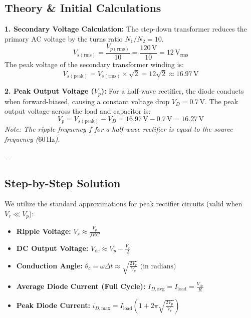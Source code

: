 \documentclass[12pt,a3paper]{article}
\begin{document}
\begin{enumerate}
\begin{tcolorbox}[enhanced,breakable,ansbox,colback=cA!4,colframe=cA,boxrule=0.8pt,arc=5pt,title={\textbf{Answer}},fonttitle=\bfseries\color{white},colbacktitle=cA]
\subsection*{Theory \& Initial Calculations}

\textbf{1. Secondary Voltage Calculation:}
The step-down transformer reduces the primary AC voltage by the turns ratio $N_1/N_2 = 10$.
\begin{equation}
    V_{s(\text{rms})} = \frac{V_{p(\text{rms})}}{10} = \frac{120\,\text{V}}{10} = 12\,\text{V}_{\text{rms}}
\end{equation}
The peak voltage of the secondary transformer winding is:
\begin{equation}
    V_{s(\text{peak})} = V_{s(\text{rms})} \times \sqrt{2} = 12\sqrt{2} \approx 16.97\,\text{V}
\end{equation}

\textbf{2. Peak Output Voltage ($V_p$):}
For a half-wave rectifier, the diode conducts when forward-biased, causing a constant voltage drop $V_D = 0.7\,\text{V}$. The peak output voltage across the load and capacitor is:
\begin{equation}
    V_p = V_{s(\text{peak})} - V_D = 16.97\,\text{V} - 0.7\,\text{V} = 16.27\,\text{V}
\end{equation}
\textit{Note: The ripple frequency $f$ for a half-wave rectifier is equal to the source frequency ($60\,\text{Hz}$).}

---

\subsection*{Step-by-Step Solution}

We utilize the standard approximations for peak rectifier circuits (valid when $V_r \ll V_p$):
\begin{itemize}
    \item \textbf{Ripple Voltage:} $V_r \approx \frac{V_p}{f R C}$
    \item \textbf{DC Output Voltage:} $V_{\text{dc}} \approx V_p - \frac{V_r}{2}$
    \item \textbf{Conduction Angle:} $\theta_c = \omega \Delta t \approx \sqrt{\frac{2 V_r}{V_p}} \text{ (in radians)}$
    \item \textbf{Average Diode Current (Full Cycle):} $I_{D,\text{avg}} = I_{\text{load}} = \frac{V_{\text{dc}}}{R}$
    \item \textbf{Peak Diode Current:} $i_{D,\text{max}} = I_{\text{load}} \left( 1 + 2\pi \sqrt{\frac{2 V_p}{V_r}} \right)$
\end{itemize}


\end{tcolorbox}
\end{enumerate}
\end{document}
